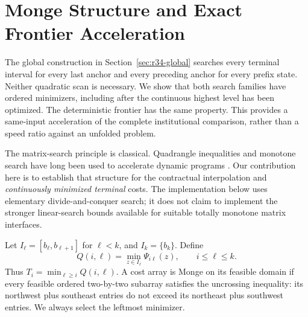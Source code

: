 \section{Monge Structure and Exact Frontier Acceleration}\label{sec:r35-monge}
The global construction in Section~\ref{sec:r34-global} searches every terminal interval for every last anchor and every preceding anchor for every prefix state. Neither quadratic scan is necessary. We show that both search families have ordered minimizers, including after the continuous highest level has been optimized. The deterministic frontier has the same property. This provides a same-input acceleration of the complete institutional comparison, rather than a speed ratio against an unfolded problem.

The matrix-search principle is classical. Quadrangle inequalities and monotone search have long been used to accelerate dynamic programs \citep{Yao1980,AggarwalEtAl1987}. Our contribution here is to establish that structure for the contractual interpolation and \emph{continuously minimized terminal} costs. The implementation below uses elementary divide-and-conquer search; it does not claim to implement the stronger linear-search bounds available for suitable totally monotone matrix interfaces.

Let $I_\ell=[b_\ell,b_{\ell+1}]$ for $\ell<k$, and $I_k=\{b_k\}$. Define
\begin{equation}\label{eq:r35-Q}
 Q(i,\ell)=\min_{z\in I_\ell}\Psi_{i\ell}(z),\qquad i\leq\ell\leq k.
\end{equation}
Thus $T_i=\min_{\ell\geq i}Q(i,\ell)$. A cost array is Monge on its feasible domain if every feasible ordered two-by-two subarray satisfies the uncrossing inequality: its northwest plus southeast entries do not exceed its northeast plus southwest entries. We always select the leftmost minimizer.

